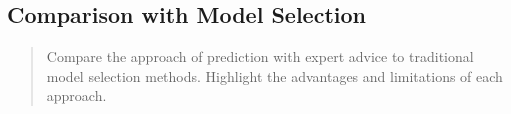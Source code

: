 \documentclass[11pt]{article} %
\theoremstyle{plain}
\theoremstyle{definition}
\begin{document}
\subsection{Comparison with Model Selection}
\begin{quote}
  Compare the approach of prediction with expert advice to traditional model selection methods. Highlight the advantages and limitations of each approach.
\end{quote}

\newpage



\end{document}
